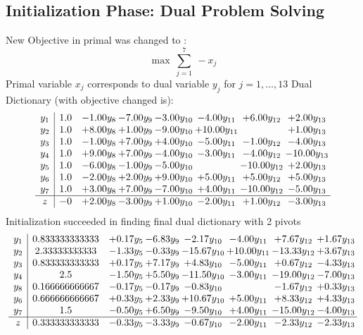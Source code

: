 \documentclass[8pt]{article}
\begin{document}
\subsection{Initialization Phase: Dual Problem Solving}
New Objective in primal was changed to : \[ \max\ \sum_{j=1}^{7}\ - x_j \] 
Primal variable $x_j$ corresponds to dual variable $y_j$ for $j = 1,\ldots,13$
Dual Dictionary (with objective changed is): 
\[\begin{array}{c| c c@{\hskip 2pt} c@{\hskip 2pt} c@{\hskip 2pt} c@{\hskip 2pt} c@{\hskip 2pt} c@{\hskip 2pt} }
 y_{1}   &  1.0 & -1.00 y_{8} & -7.00 y_{9} & -3.00 y_{10} & -4.00 y_{11} & +  6.00 y_{12} & +  2.00 y_{13}\\
 y_{2}   &  1.0 & +  8.00 y_{8} & +  1.00 y_{9} & -9.00 y_{10} & + 10.00 y_{11} &   & +  1.00 y_{13}\\
 y_{3}   &  1.0 & -1.00 y_{8} & +  7.00 y_{9} & +  4.00 y_{10} & -5.00 y_{11} & -1.00 y_{12} & -4.00 y_{13}\\
 y_{4}   &  1.0 & +  9.00 y_{8} & +  7.00 y_{9} & -4.00 y_{10} & -3.00 y_{11} & -4.00 y_{12} & -10.00 y_{13}\\
 y_{5}   &  1.0 & -6.00 y_{8} & -1.00 y_{9} & -5.00 y_{10} &   & -10.00 y_{12} & +  2.00 y_{13}\\
 y_{6}   &  1.0 & -2.00 y_{8} & +  2.00 y_{9} & +  9.00 y_{10} & +  5.00 y_{11} & +  5.00 y_{12} & +  5.00 y_{13}\\
 y_{7}   &  1.0 & +  3.00 y_{8} & +  7.00 y_{9} & -7.00 y_{10} & +  4.00 y_{11} & -10.00 y_{12} & -5.00 y_{13}\\
\hline
z    &  -0 & +  2.00 y_{8} & -3.00 y_{9} & +  1.00 y_{10} & -2.00 y_{11} & +  1.00 y_{12} & -3.00 y_{13}\\
\end{array}\]
Initialization succeeded in finding final dual dictionary with 2 pivots
\[\begin{array}{c| c c@{\hskip 2pt} c@{\hskip 2pt} c@{\hskip 2pt} c@{\hskip 2pt} c@{\hskip 2pt} c@{\hskip 2pt} }
 y_{1}   &  0.833333333333 & +  0.17 y_{5} & -6.83 y_{9} & -2.17 y_{10} & -4.00 y_{11} & +  7.67 y_{12} & +  1.67 y_{13}\\
 y_{2}   &  2.33333333333 & -1.33 y_{5} & -0.33 y_{9} & -15.67 y_{10} & + 10.00 y_{11} & -13.33 y_{12} & +  3.67 y_{13}\\
 y_{3}   &  0.833333333333 & +  0.17 y_{5} & +  7.17 y_{9} & +  4.83 y_{10} & -5.00 y_{11} & +  0.67 y_{12} & -4.33 y_{13}\\
 y_{4}   &  2.5 & -1.50 y_{5} & +  5.50 y_{9} & -11.50 y_{10} & -3.00 y_{11} & -19.00 y_{12} & -7.00 y_{13}\\
 y_{8}   &  0.166666666667 & -0.17 y_{5} & -0.17 y_{9} & -0.83 y_{10} &   & -1.67 y_{12} & +  0.33 y_{13}\\
 y_{6}   &  0.666666666667 & +  0.33 y_{5} & +  2.33 y_{9} & + 10.67 y_{10} & +  5.00 y_{11} & +  8.33 y_{12} & +  4.33 y_{13}\\
 y_{7}   &  1.5 & -0.50 y_{5} & +  6.50 y_{9} & -9.50 y_{10} & +  4.00 y_{11} & -15.00 y_{12} & -4.00 y_{13}\\
\hline
z    &  0.333333333333 & -0.33 y_{5} & -3.33 y_{9} & -0.67 y_{10} & -2.00 y_{11} & -2.33 y_{12} & -2.33 y_{13}\\
\end{array}\]
\end{document}
